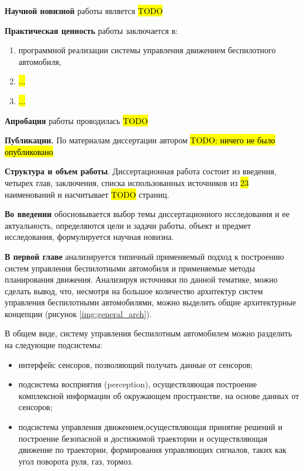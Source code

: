 \textbf{Научной новизной} работы является \hl{TODO}

\textbf{Практическая ценность} работы заключается в:
\begin{enumerate}
    \item программной реализации системы управления движением беспилотного автомобиля,
    \item \hl{...}
    \item \hl{...}
\end{enumerate}

\textbf{Апробация} работы проводилась \hl{TODO}

\textbf{Публикации.} По материалам диссертации автором \hl{TODO: ничего не было опубликовано}

\textbf{Структура и объем работы}. Диссертационная работа состоит из введения, четырех глав, заключения, 
списка использованных источников из \hl{23} наименований и насчитывает \hl{TODO} страниц.

\textbf{Во введении} обосновывается выбор темы диссертационного исследования и ее актуальность,
определяются цели и задачи работы, объект и предмет исследования, формулируется научная новизна.

\textbf{В первой главе} анализируется типичный применяемый подход к построению систем управления
беспилотными автомобиля и применяемые методы планирования движения. Анализируя источники по данной тематике,
можно сделать вывод, что, несмотря на большое количество архитектур систем управления беспилотными
автомобилями, можно выделить общие архитектурные концепции (рисунок \ref{img:general_arch}).

В общем виде, систему управления беспилотным автомобилем
можно разделить на следующие подсистемы:
\begin{itemize}
    \item интерфейс сенсоров, позволяющий получать данные от сенсоров;
    \item подсистема восприятия (perception), осуществляющая построение комплексной информации об
    окружающем пространстве, на основе данных от сенсоров;
    \item подсистема управления движением,осуществляющая принятие решений и построение безопасной
    и достижимой траектории и осуществляющая движение по траектории, формирования управляющих сигналов,
    таких как угол поворота руля, газ, тормоз. 
\end{itemize}

